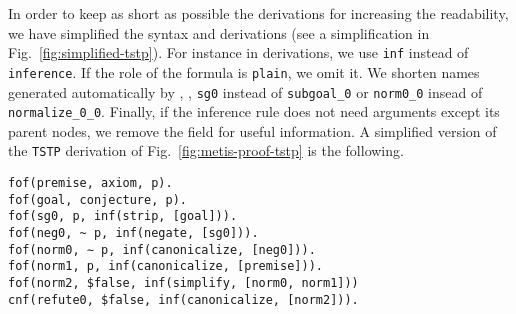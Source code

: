 \documentclass[../main.tex]{subfiles}
\begin{document}
\begin{remark}
In order to keep as short as possible the \Metis derivations
for increasing the readability, we have simplified the \TSTP
syntax and \Metis derivations (see a simplification in Fig.~\ref{fig:simplified-tstp}).
For instance in \TSTP derivations, we use \verb!inf! instead of \verb!inference!. If the role of the formula is \verb!plain!, we omit it.
We shorten names generated automatically by \Metis, \eg,
\verb!sg0! instead of \verb!subgoal_0! or \verb!norm0_0!
insead of \verb!normalize_0_0!.
Finally, if the inference rule does not need arguments except its parent nodes, we remove the field for useful information.
A simplified version of the \texttt{TSTP} derivation of Fig.~\ref{fig:metis-proof-tstp} is the following.

\begin{verbatim}
fof(premise, axiom, p).
fof(goal, conjecture, p).
fof(sg0, p, inf(strip, [goal])).
fof(neg0, ~ p, inf(negate, [sg0])).
fof(norm0, ∼ p, inf(canonicalize, [neg0])).
fof(norm1, p, inf(canonicalize, [premise])).
fof(norm2, $false, inf(simplify, [norm0, norm1]))
cnf(refute0, $false, inf(canonicalize, [norm2])).
\end{verbatim}

\end{remark}
\end{document}
